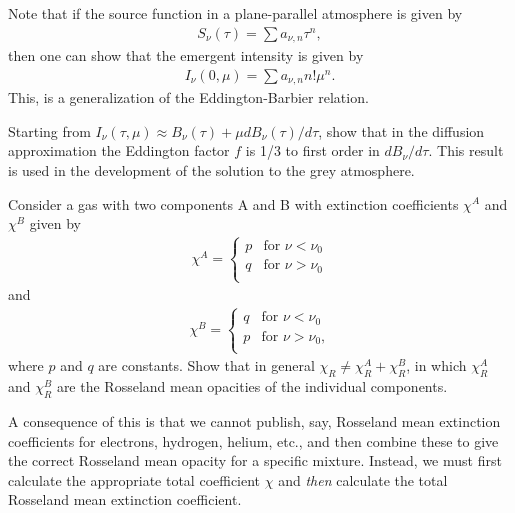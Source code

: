 \begin{problem}
\begin{enumerate}

\end{enumerate}

Note that if the source function in a plane-parallel atmosphere is
given by
\begin{align}
S_\nu(\tau) = \sum a_{\nu,n}
\tau^n,
\end{align}
then one can show that the emergent intensity is given by
\begin{align}
I_\nu(0, \mu) = \sum a_{\nu,n} n! \mu^n.
\end{align}
This, is a generalization of the
Eddington-Barbier relation.

\end{problem}

\problemset

\begin{problem}
\label{problem-eddington-factor-in-diffusion-approximation}
Starting from $I_\nu(\tau,\mu) \approx B_\nu(\tau) + \mu dB_\nu(\tau)/d\tau$, show that in the diffusion approximation the Eddington factor $f$
is 1/3 to first order in $dB_\nu/d\tau$.
This result is used in the development of the solution to
the grey atmosphere.
\end{problem}

\begin{problem}
\label{problem-rosseland-mean-opacity}
Consider a gas with two components A and B with extinction coefficients $\chi^A$ and $\chi^B$ given by
\begin{align}
\chi^A = 
\left\{
\begin{array}{ll}
p&\mbox{for $\nu < \nu_0$}\\
q&\mbox{for $\nu > \nu_0$}\\
\end{array}
\right.
\end{align}
and
\begin{align}
\chi^B = 
\left\{
\begin{array}{ll}
q&\mbox{for $\nu < \nu_0$}\\
p&\mbox{for $\nu > \nu_0$,}\\
\end{array}
\right.
\end{align}
where $p$ and $q$ are constants. Show that in general $\chi_R \ne \chi^A_R + \chi^B_R$, in which $\chi^A_R$ and $\chi^B_R$ are the Rosseland mean opacities of the individual components.

A consequence of this is that we cannot publish, say,
Rosseland mean extinction coefficients for electrons,
hydrogen, helium, etc., and then combine these to give the
correct Rosseland mean opacity for a specific mixture.
Instead, we must first calculate the appropriate total
coefficient $\chi$ and \emph{then} calculate the total
Rosseland mean extinction coefficient.

\end{problem}

